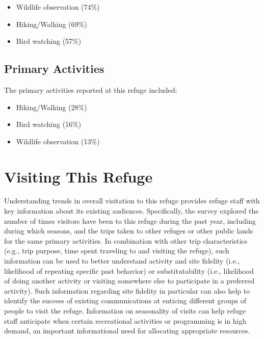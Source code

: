\documentclass[]{book}
\providecommand{\tightlist}{%
  \setlength{\itemsep}{0pt}\setlength{\parskip}{0pt}}
\let\BeginKnitrBlock\begin \let\EndKnitrBlock\end
\begin{document}
\begin{itemize}
\tightlist
\item
  Wildlife observation (74\%)
\item
  Hiking/Walking (69\%)
\item
  Bird watching (57\%)
\end{itemize}

\subsection{Primary Activities}\label{primary-activities}

The primary activities reported at this refuge included:

\begin{itemize}
\tightlist
\item
  Hiking/Walking (28\%)
\item
  Bird watching (16\%)
\item
  Wildlife observation (13\%)
\end{itemize}

\section{Visiting This Refuge}\label{visiting-this-refuge}

\BeginKnitrBlock{preamble1}
Understanding trends in overall visitation to this refuge provides
refuge staff with key information about its existing audiences.
Specifically, the survey explored the number of times visitors have been
to this refuge during the past year, including during which seasons, and
the trips taken to other refuges or other public lands for the same
primary activities. In combination with other trip characteristics
(e.g., trip purpose, time spent traveling to and visiting the refuge),
such information can be used to better understand activity and site
fidelity (i.e., likelihood of repeating specific past behavior) or
substitutability (i.e., likelihood of doing another activity or visiting
somewhere else to participate in a preferred activity). Such information
regarding site fidelity in particular can also help to identify the
success of existing communications at enticing different groups of
people to visit the refuge. Information on seasonality of visits can
help refuge staff anticipate when certain recreational activities or
programming is in high demand, an important informational need for
allocating appropriate resources.
\EndKnitrBlock{preamble1}
\end{document}
